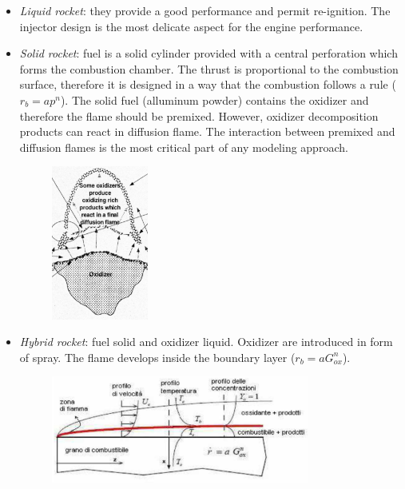 \documentclass[12pt]{article}
\begin{document}
\begin{itemize}
    \item \textit{Liquid rocket}: they provide a good performance and permit re-ignition. The injector design is the most delicate aspect for the engine performance.
    \item \textit{Solid rocket}: fuel is a solid cylinder provided with a central perforation which forms the combustion chamber. The thrust is proportional to the combustion surface, therefore it is designed in a way that the combustion follows a rule ($r_{b}=ap^{n}$). The solid fuel (alluminum powder) contains the oxidizer and therefore the flame should be premixed. However, oxidizer decomposition products can react in diffusion flame. The interaction between premixed and diffusion flames is the most critical part of any modeling approach.

\begin{figure}[!ht]
\centering
\includegraphics[width=0.3\textwidth]{figures/flame_solid.png}
\end{figure}

    \item \textit{Hybrid rocket}: fuel solid and oxidizer liquid. Oxidizer are introduced in form of spray. The flame develops inside the boundary layer ($r_{b}=aG_{ox}^{n}$).

\begin{figure}[!ht]
\centering
\includegraphics[width=0.8\textwidth]{figures/hybrid.png}
\end{figure}

\end{itemize}
\end{document}
